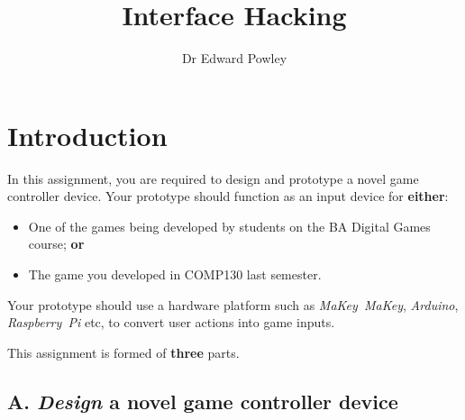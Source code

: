 \documentclass{../fal_assignment}
\title{Interface Hacking}
\author{Dr Edward Powley}
\begin{document}
\maketitle
%    
\section*{Introduction}

In this assignment, you are required to design and prototype a novel game controller device.
Your prototype should function as an input device for \textbf{either}:
\begin{itemize}
\item One of the games being developed by students on the BA Digital Games course; \textbf{or}
\item The game you developed in COMP130 last semester.
\end{itemize}
Your prototype should use a hardware platform such as \emph{MaKey~MaKey}, \emph{Arduino}, \emph{Raspberry~Pi} etc,
to convert user actions into game inputs.


This assignment is formed of \textbf{three} parts.

\subsection*{A. \emph{Design} a novel game controller device}
\end{document}
